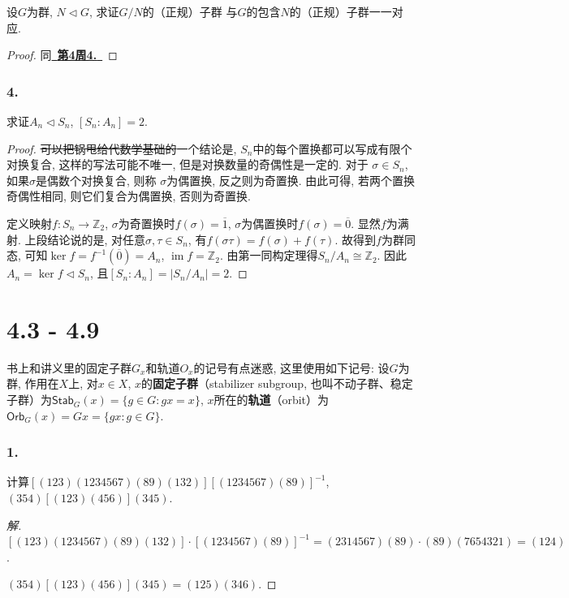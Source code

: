 \documentclass[12pt, a4paper, fontset=windows]{ctexart}
\newcommand{\Z}{\mathbb{Z}}
\newcommand{\Orb}{\mathsf{Orb}}
\newcommand{\Stab}{\mathsf{Stab}}
\newcommand{\abs}[1]{\left|{#1}\right|}
\newcommand{\cl}[1]{\overline{#1}} %
\newcommand{\im}{\operatorname{im}}
\newcommand{\isom}{\cong} %
\newcommand{\kh}[1]{（{#1}）} %
\newcommand{\myref}[2][]{\hyperref[#1]{\color{blue}\ {#2}\ }}
\newenvironment{solution}{\begin{proof}[解]}{\end{proof}}
\begin{document}
设$G$为群, $N\lhd G$, 求证$G/N$的\kh{正规}子群
与$G$的包含$N$的\kh{正规}子群一一对应. 

\begin{proof}
同\myref[group-correspond]{\bf 第4周4.}
\end{proof}

\section*{4.}

求证$A_n\lhd S_n$, $[S_n:A_n]=2$. 

\begin{proof}
\sout{可以把锅甩给代数学基础的}一个结论是, %
$S_n$中的每个置换都可以写成有限个对换复合, 
这样的写法可能不唯一, 但是对换数量的奇偶性是一定的. 对于
$\sigma\in S_n$, 如果$\sigma$是偶数个对换复合, 则称
$\sigma$为偶置换, 反之则为奇置换. 由此可得, 若两个置换
奇偶性相同, 则它们复合为偶置换, 否则为奇置换. 

定义映射$f:S_n\to\Z_2$, $\sigma$为奇置换时$f(\sigma)=\cl{1}$, 
$\sigma$为偶置换时$f(\sigma)=\cl{0}$. 显然$f$为满射. 
上段结论说的是, 对任意$\sigma,\tau\in S_n$, 
有$f(\sigma\tau)=f(\sigma)+f(\tau)$. 
故得到$f$为群同态, 可知$\ker f=f^{-1}(\cl{0})=A_n$, 
$\im f=\Z_2$. 由第一同构定理得$S_n/A_n\isom\Z_2$. 
因此$A_n=\ker f\lhd S_n$, 且$[S_n:A_n]=\abs{S_n/A_n}=2$. 
\end{proof}

\clearpage
\part{4.3 - 4.9}

书上和讲义里的固定子群$G_x$和轨道$O_x$的记号有点迷惑, 
这里使用如下记号: 设$G$为群, 作用在$X$上, 对$x\in X$, 
$x$的{\bf 固定子群}\kh{stabilizer subgroup, 
也叫不动子群、稳定子群}为$\Stab_G(x)=\{g\in G:gx=x\}$, 
$x$所在的{\bf 轨道}\kh{orbit}为$\Orb_G(x)=Gx=\{gx:g\in G\}$. 

\section*{1.}

计算$[(123)(1234567)(89)(132)][(1234567)(89)]^{-1}$, $(354)[(123)(456)](345)$. 

\begin{solution}
$[(123)(1234567)(89)(132)]\cdot[(1234567)(89)]^{-1}
=(2314567)(89)\cdot(89)(7654321)=(124)$. 

$(354)[(123)(456)](345)=(125)(346)$. 
\end{solution}
\end{document}
